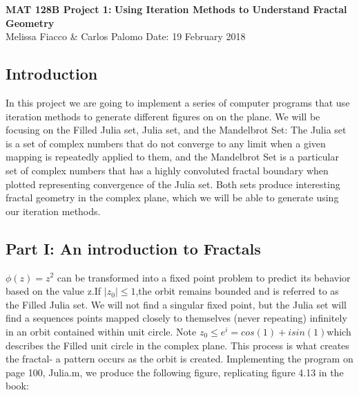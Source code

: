 \documentclass[11pt]{article}
\theoremstyle{plain}
\theoremstyle{definition}
\begin{document}
	

	\begin{titlepage}
	\begin{center}
			\vspace*{1cm}
			\textbf{MAT 128B Project 1: }\linebreak
			\textbf{Using Iteration Methods to Understand Fractal Geometry}\\
			\vspace{1.0cm}
			{Melissa Fiacco \& Carlos Palomo}\linebreak
			Date: 19 February 2018\linebreak	
		\end{center}
	\end{titlepage}

\subsection*{Introduction}
In this project we are going to implement a series of computer programs that use iteration methods to generate different figures on on the plane. We will be focusing on the Filled Julia set, Julia set, and the Mandelbrot Set: The Julia set is a set of complex numbers that do not converge to any limit when a given mapping is repeatedly applied to them, and the Mandelbrot Set is a particular set of complex numbers that has a highly convoluted fractal boundary when plotted representing convergence of the Julia set. Both sets produce interesting fractal geometry in the complex plane, which we will be able to generate using our iteration methods.

\subsection*{Part I: An introduction to Fractals}
$ \phi(z)=z^2$ can be transformed into a fixed point problem to predict its behavior based on the value z.If $ |z_0| \le 1$,the orbit remains bounded and is referred to as the Filled Julia set. We will not find a singular fixed point, but the Julia set will find a sequences points mapped closely to themselves (never repeating) infinitely in an orbit contained within unit circle. Note $ z_0 \le e^i = cos(1) + isin(1) $which describes the Filled unit circle in the complex plane. This process is what creates the fractal- a pattern occurs as the orbit is created.
Implementing the program on page 100, Julia.m, we produce the following figure, replicating figure 4.13 in the book:
\end{document}
